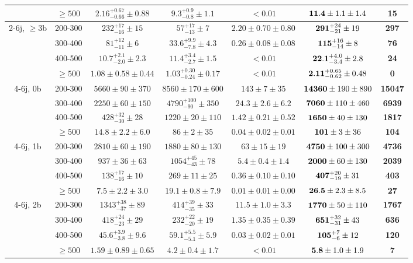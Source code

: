\begin{table}[!ht]
{\begin{tabular}{c|c||c|c|c|c|c}
 & $\geq500$ & $2.16^{+0.67}_{-0.66}\pm0.88$ & $9.3^{+0.9}_{-0.8}\pm1.1$ & $<0.01$ & ${\bf 11.4}\pm1.1\pm1.4$ & {\bf 15}\\ 
\hline
\multirow{4}{*}{2-6j, $\geq3$b} & 200-300 & $232^{+17}_{-16}\pm15$ & $57^{+17}_{-13}\pm7$ & $2.20\pm0.70\pm0.80$ & ${\bf 291}^{+24}_{-21}\pm19$ & {\bf 297}\\ 
 & 300-400 & $81^{+12}_{-11}\pm6$ & $33.6^{+9.9}_{-7.8}\pm4.3$ & $0.26\pm0.08\pm0.08$ & ${\bf 115}^{+16}_{-14}\pm8$ & {\bf 76}\\ 
 & 400-500 & $10.7^{+2.1}_{-2.0}\pm2.3$ & $11.4^{+3.4}_{-2.7}\pm1.5$ & $<0.01$ & ${\bf 22.1}^{+4.0}_{-3.4}\pm2.8$ & {\bf 24}\\ 
 & $\geq500$ & $1.08\pm0.58\pm0.44$ & $1.03^{+0.30}_{-0.24}\pm0.17$ & $<0.01$ & ${\bf 2.11}^{+0.65}_{-0.62}\pm0.48$ & {\bf 0}\\ 
\hline
\multirow{4}{*}{4-6j, 0b} & 200-300 & $5660\pm90\pm370$ & $8560\pm170\pm600$ & $143\pm7\pm35$ & ${\bf 14360}\pm190\pm890$ & {\bf 15047}\\ 
 & 300-400 & $2250\pm60\pm150$ & $4790^{+100}_{-90}\pm350$ & $24.3\pm2.6\pm6.2$ & ${\bf 7060}\pm110\pm460$ & {\bf 6939}\\ 
 & 400-500 & $428^{+32}_{-30}\pm28$ & $1220\pm20\pm110$ & $1.42\pm0.21\pm0.52$ & ${\bf 1650}\pm40\pm130$ & {\bf 1817}\\ 
 & $\geq500$ & $14.8\pm2.2\pm6.0$ & $86\pm2\pm35$ & $0.04\pm0.02\pm0.01$ & ${\bf 101}\pm3\pm36$ & {\bf 104}\\ 
\hline
\multirow{4}{*}{4-6j, 1b} & 200-300 & $2810\pm60\pm190$ & $1880\pm80\pm130$ & $63\pm15\pm19$ & ${\bf 4750}\pm100\pm300$ & {\bf 4736}\\ 
 & 300-400 & $937\pm36\pm63$ & $1054^{+45}_{-43}\pm78$ & $5.4\pm0.4\pm1.4$ & ${\bf 2000}\pm60\pm130$ & {\bf 2039}\\ 
 & 400-500 & $138^{+17}_{-16}\pm10$ & $269\pm11\pm25$ & $0.36\pm0.10\pm0.10$ & ${\bf 407}^{+20}_{-19}\pm31$ & {\bf 403}\\ 
 & $\geq500$ & $7.5\pm2.2\pm3.0$ & $19.1\pm0.8\pm7.9$ & $0.01\pm0.01\pm0.00$ & ${\bf 26.5}\pm2.3\pm8.5$ & {\bf 27}\\ 
\hline
\multirow{4}{*}{4-6j, 2b} & 200-300 & $1343^{+38}_{-37}\pm89$ & $414^{+39}_{-35}\pm33$ & $11.5\pm1.0\pm3.3$ & ${\bf 1770}\pm50\pm110$ & {\bf 1767}\\ 
 & 300-400 & $418^{+24}_{-23}\pm29$ & $232^{+22}_{-20}\pm19$ & $1.35\pm0.35\pm0.39$ & ${\bf 651}^{+32}_{-31}\pm43$ & {\bf 636}\\ 
 & 400-500 & $45.6^{+3.9}_{-3.8}\pm9.6$ & $59.1^{+5.5}_{-5.1}\pm5.9$ & $0.03\pm0.02\pm0.01$ & ${\bf 105}^{+7}_{-6}\pm12$ & {\bf 120}\\ 
 & $\geq500$ & $1.59\pm0.89\pm0.65$ & $4.2\pm0.4\pm1.7$ & $<0.01$ & ${\bf 5.8}\pm1.0\pm1.9$ & {\bf 7}\\ 

\hline
\end{tabular}}
\end{table}


